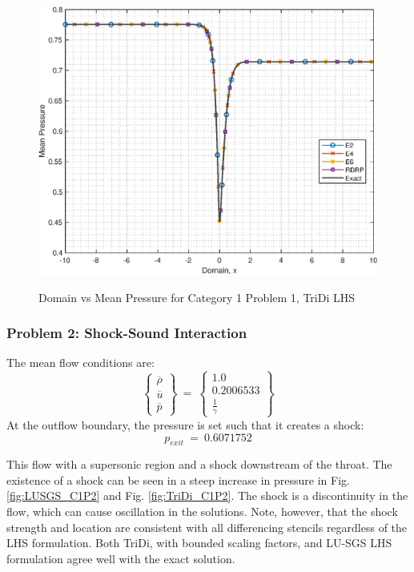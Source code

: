 \documentclass[conf]{new-aiaa}
\begin{document}
\begin{figure}[hbtp!]
	\centering
	{\includegraphics[width=.7\textwidth]{Figures/TriDi_C1P1}}
	\caption{Domain vs Mean Pressure for Category 1 Problem 1, TriDi LHS}
	\label{fig:TriDi_C1P1}
\end{figure}



\subsubsection{Problem 2: Shock-Sound Interaction}
The mean flow conditions are: 
\begin{equation*}
	\left\{
	\begin{matrix}
		\overline{\rho} \\
		\overline{u} \\
		\overline{p}
	\end{matrix}
	\right\}~=~
	\left\{
	\begin{matrix}
		1.0 \\
		0.2006533 \\
		\frac{1}{\gamma}
	\end{matrix}
	\right\}
\end{equation*}
At the outflow boundary, the pressure is set such that it creates a shock: 
\begin{equation*}
	p_{exit}~=~0.6071752
\end{equation*}

This flow with a supersonic region and a shock downstream of the throat. 
The existence of a shock can be seen in a steep increase in pressure in Fig. \ref{fig:LUSGS_C1P2} and Fig. \ref{fig:TriDi_C1P2}. 
The shock is a discontinuity in the flow, which can cause oscillation in the solutions. 
Note, however, that the shock strength and location are consistent with all differencing stencils regardless of the LHS formulation.  
Both TriDi, with bounded scaling factors, and LU-SGS LHS formulation agree well with the exact solution.
\end{document}
